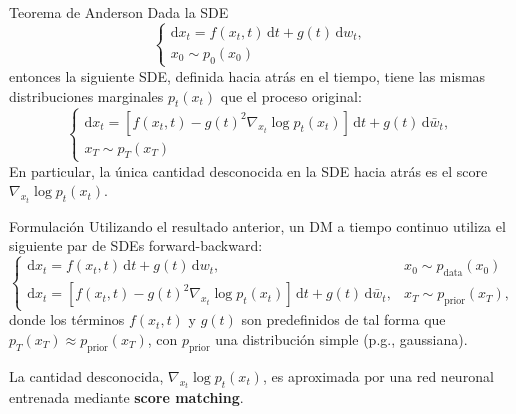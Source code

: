 \documentclass{beamer}
\begin{document}
\begin{frame}{Teorema de Anderson}
    Dada la SDE
    \begin{equation*}
        \begin{cases}
            \text{d}x_t = f(x_t,t)\,\text{d}t + g(t)\,\text{d}w_t, \\
            x_0\sim p_0(x_0)
        \end{cases}
    \end{equation*}
    entonces la siguiente SDE, definida hacia atrás en el tiempo, tiene las mismas distribuciones marginales $p_t(x_t)$ que el proceso original:
    \begin{equation*}
        \begin{cases}
            \text{d}x_t = \left[f(x_t,t) - g(t)^2 \nabla_{x_t} \log p_t(x_t)\right]\,\text{d}t + g(t)\,\text{d}\bar{w}_t, \\
            x_T\sim p_T(x_T)
        \end{cases}
    \end{equation*}
    En particular, la única cantidad desconocida en la SDE hacia atrás es el score $\nabla_{x_t} \log p_t(x_t)$.
\end{frame}

\begin{frame}{Formulación}
    Utilizando el resultado anterior, un DM a tiempo continuo utiliza el siguiente par de SDEs forward-backward:
    \begin{equation*}
        \begin{cases}
            \text{d}x_t = f(x_t,t)\,\text{d}t + g(t)\,\text{d}w_t,                                                        & x_0\sim p_{\text{data}}(x_0) \\
            \text{d}x_t = \left[f(x_t,t) - g(t)^2 \nabla_{x_t} \log p_t(x_t)\right]\,\text{d}t + g(t)\,\text{d}\bar{w}_t, & x_T\sim p_\text{prior}(x_T),
        \end{cases}
    \end{equation*}
    donde los términos $f(x_t,t)$ y $g(t)$ son predefinidos de tal forma que $p_T(x_T)\approx p_\text{prior}(x_T)$, con $p_\text{prior}$ una distribución simple (p.g., gaussiana).

    La cantidad desconocida, $\nabla_{x_t} \log p_t(x_t)$, es aproximada por una red neuronal entrenada mediante \textbf{score matching}.
\end{frame}
\end{document}
